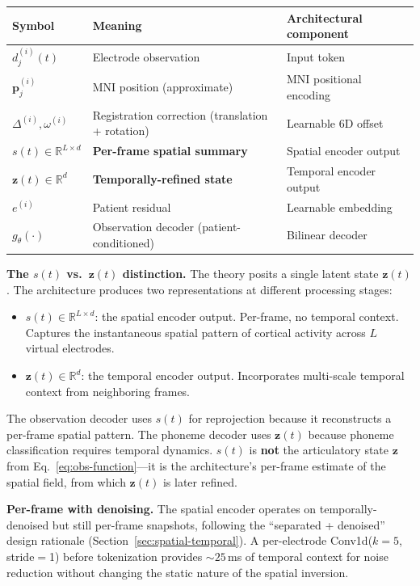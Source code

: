 \documentclass[11pt,letterpaper]{article}
\newcommand{\bfp}{\mathbf{p}}
\newcommand{\bfz}{\mathbf{z}}
\newcommand{\R}{\mathbb{R}}
\begin{document}
\begin{table}[ht!]\centering\small
\begin{tabular}{@{}lll@{}}
\toprule
\textbf{Symbol} & \textbf{Meaning} & \textbf{Architectural component} \\
\midrule
$d_j^{(i)}(t)$ & Electrode observation & Input token \\
$\bfp_j^{(i)}$ & MNI position (approximate) & MNI positional encoding \\
$\Delta^{(i)}, \omega^{(i)}$ & Registration correction (translation + rotation) & Learnable 6D offset \\
$s(t) \in \R^{L \times d}$ & \textbf{Per-frame spatial summary} & Spatial encoder output \\
$\bfz(t) \in \R^d$ & \textbf{Temporally-refined state} & Temporal encoder output \\
$e^{(i)}$ & Patient residual & Learnable embedding \\
$g_\theta(\cdot)$ & Observation decoder (patient-conditioned) & Bilinear decoder \\
\bottomrule
\end{tabular}
\end{table}

\textbf{The $s(t)$ vs.\ $\bfz(t)$ distinction.} The theory posits a single latent state $\bfz(t)$. The architecture produces two representations at different processing stages:
\begin{itemize}[leftmargin=2em]
\item $s(t) \in \R^{L \times d}$: the spatial encoder output. Per-frame, no temporal context. Captures the instantaneous spatial pattern of cortical activity across $L$ virtual electrodes.
\item $\bfz(t) \in \R^d$: the temporal encoder output. Incorporates multi-scale temporal context from neighboring frames.
\end{itemize}

The observation decoder uses $s(t)$ for reprojection because it reconstructs a per-frame spatial pattern. The phoneme decoder uses $\bfz(t)$ because phoneme classification requires temporal dynamics. $s(t)$ is \textbf{not} the articulatory state $\bfz$ from Eq.~\eqref{eq:obs-function}---it is the architecture's per-frame estimate of the spatial field, from which $\bfz(t)$ is later refined.

\textbf{Per-frame with denoising.} The spatial encoder operates on temporally-denoised but still per-frame snapshots, following the ``separated + denoised'' design rationale (Section~\ref{sec:spatial-temporal}). A per-electrode Conv1d($k{=}5$, stride$=$1) before tokenization provides ${\sim}25$\,ms of temporal context for noise reduction without changing the static nature of the spatial inversion.
\end{document}
